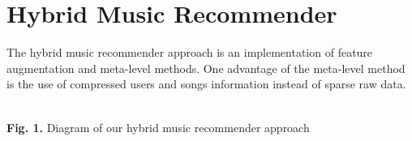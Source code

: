 
\section{Hybrid Music Recommender}

The hybrid music recommender approach is an implementation of feature augmentation and meta-level methods. One advantage of the meta-level method is the use of compressed users and songs information instead of sparse raw data.

\begin{center}
	\\
	{\large \textbf{Fig. 1.} Diagram of our hybrid music recommender approach}
\end{center}
